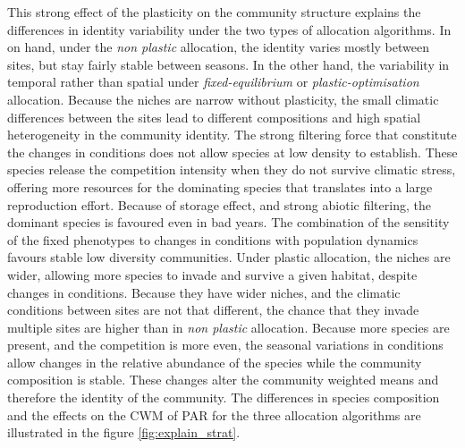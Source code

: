 This strong effect of the plasticity on the community structure explains the differences in identity variability under the two types of allocation algorithms. In on hand, under the \textit{non plastic} allocation, the identity varies mostly between sites, but stay fairly stable between seasons. In the other hand, the variability in temporal rather than spatial under \textit{fixed-equilibrium} or \textit{plastic-optimisation} allocation. Because the niches are narrow without plasticity, the small climatic differences between the sites lead to different compositions and high spatial heterogeneity in the community identity. The strong filtering force that constitute the changes in conditions does not allow species at low density to establish. These species release the competition intensity when they do not survive climatic stress, offering more resources for the dominating species that translates into a large reproduction effort. Because of storage effect, and strong abiotic filtering, the dominant species is favoured even in bad years. The combination of the sensitity of the fixed phenotypes to changes in conditions with population dynamics favours stable low diversity communities. Under plastic allocation, the niches are wider, allowing more species to invade and survive a given habitat, despite changes in conditions. Because they have wider niches, and the climatic conditions between sites are not that different, the chance that they invade multiple sites are higher than in \textit{non plastic} allocation. Because more species are present, and the competition is more even, the seasonal variations in conditions allow changes in the relative abundance of the species while the community composition is stable. These changes alter the community weighted means and therefore the identity of the community. The differences in species composition and the effects on the CWM of PAR for the three allocation algorithms are illustrated in the figure \ref{fig:explain_strat}.

